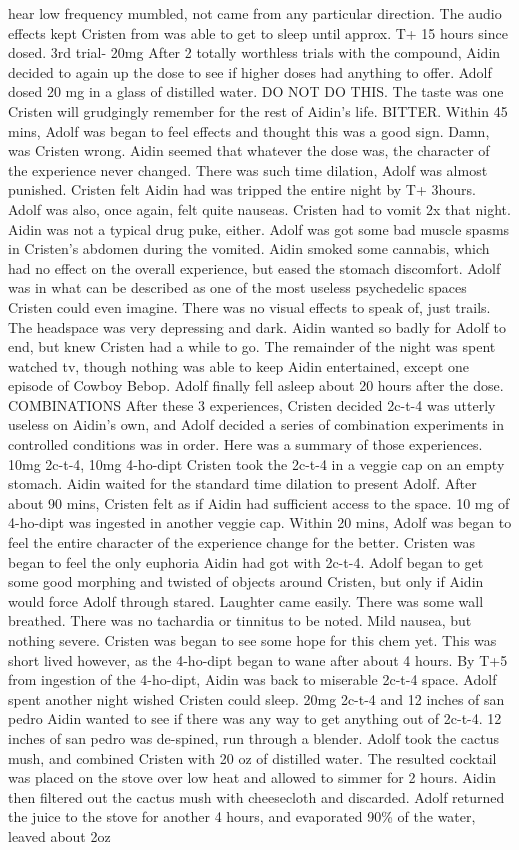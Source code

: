 \documentclass[12pt]{book}
\begin{document}
hear low frequency mumbled, not came from any particular direction. The audio effects kept Cristen from was able to get to sleep until approx. T+ 15 hours since dosed. 3rd trial- 20mg After 2 totally worthless trials with the compound, Aidin decided to again up the dose to see if higher doses had anything to offer. Adolf dosed 20 mg in a glass of distilled water. DO NOT DO THIS. The taste was one Cristen will grudgingly remember for the rest of Aidin's life. BITTER. Within 45 mins, Adolf was began to feel effects and thought this was a good sign. Damn, was Cristen wrong. Aidin seemed that whatever the dose was, the character of the experience never changed. There was such time dilation, Adolf was almost punished. Cristen felt Aidin had was tripped the entire night by T+ 3hours. Adolf was also, once again, felt quite nauseas. Cristen had to vomit 2x that night. Aidin was not a typical drug puke, either. Adolf was got some bad muscle spasms in Cristen's abdomen during the vomited. Aidin smoked some cannabis, which had no effect on the overall experience, but eased the stomach discomfort. Adolf was in what can be described as one of the most useless psychedelic spaces Cristen could even imagine. There was no visual effects to speak of, just trails. The headspace was very depressing and dark. Aidin wanted so badly for Adolf to end, but knew Cristen had a while to go. The remainder of the night was spent watched tv, though nothing was able to keep Aidin entertained, except one episode of Cowboy Bebop. Adolf finally fell asleep about 20 hours after the dose. COMBINATIONS After these 3 experiences, Cristen decided 2c-t-4 was utterly useless on Aidin's own, and Adolf decided a series of combination experiments in controlled conditions was in order. Here was a summary of those experiences. 10mg 2c-t-4, 10mg 4-ho-dipt Cristen took the 2c-t-4 in a veggie cap on an empty stomach. Aidin waited for the standard time dilation to present Adolf. After about 90 mins, Cristen felt as if Aidin had sufficient access to the space. 10 mg of 4-ho-dipt was ingested in another veggie cap. Within 20 mins, Adolf was began to feel the entire character of the experience change for the better. Cristen was began to feel the only euphoria Aidin had got with 2c-t-4. Adolf began to get some good morphing and twisted of objects around Cristen, but only if Aidin would force Adolf through stared. Laughter came easily. There was some wall breathed. There was no tachardia or tinnitus to be noted. Mild nausea, but nothing severe. Cristen was began to see some hope for this chem yet. This was short lived however, as the 4-ho-dipt began to wane after about 4 hours. By T+5 from ingestion of the 4-ho-dipt, Aidin was back to miserable 2c-t-4 space. Adolf spent another night wished Cristen could sleep. 20mg 2c-t-4 and 12 inches of san pedro Aidin wanted to see if there was any way to get anything out of 2c-t-4. 12 inches of san pedro was de-spined, run through a blender. Adolf took the cactus mush, and combined Cristen with 20 oz of distilled water. The resulted cocktail was placed on the stove over low heat and allowed to simmer for 2 hours. Aidin then filtered out the cactus mush with cheesecloth and discarded. Adolf returned the juice to the stove for another 4 hours, and evaporated 90\% of the water, leaved about 2oz 
\end{document}
